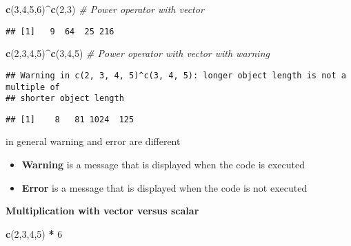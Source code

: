\documentclass[
]{article}
\newenvironment{Shaded}{\begin{snugshade}}{\end{snugshade}}
\newcommand{\CommentTok}[1]{\textcolor[rgb]{0.56,0.35,0.01}{\textit{#1}}}
\newcommand{\DecValTok}[1]{\textcolor[rgb]{0.00,0.00,0.81}{#1}}
\newcommand{\FunctionTok}[1]{\textcolor[rgb]{0.13,0.29,0.53}{\textbf{#1}}}
\newcommand{\NormalTok}[1]{#1}
\newcommand{\SpecialCharTok}[1]{\textcolor[rgb]{0.81,0.36,0.00}{\textbf{#1}}}
\begin{document}
\begin{Shaded}
\begin{Highlighting}[]
\FunctionTok{c}\NormalTok{(}\DecValTok{3}\NormalTok{,}\DecValTok{4}\NormalTok{,}\DecValTok{5}\NormalTok{,}\DecValTok{6}\NormalTok{)}\SpecialCharTok{\^{}}\FunctionTok{c}\NormalTok{(}\DecValTok{2}\NormalTok{,}\DecValTok{3}\NormalTok{) }\CommentTok{\# Power operator with vector}
\end{Highlighting}
\end{Shaded}

\begin{verbatim}
## [1]   9  64  25 216
\end{verbatim}

\begin{Shaded}
\begin{Highlighting}[]
\FunctionTok{c}\NormalTok{(}\DecValTok{2}\NormalTok{,}\DecValTok{3}\NormalTok{,}\DecValTok{4}\NormalTok{,}\DecValTok{5}\NormalTok{)}\SpecialCharTok{\^{}}\FunctionTok{c}\NormalTok{(}\DecValTok{3}\NormalTok{,}\DecValTok{4}\NormalTok{,}\DecValTok{5}\NormalTok{) }\CommentTok{\# Power operator with vector with warning}
\end{Highlighting}
\end{Shaded}

\begin{verbatim}
## Warning in c(2, 3, 4, 5)^c(3, 4, 5): longer object length is not a multiple of
## shorter object length
\end{verbatim}

\begin{verbatim}
## [1]    8   81 1024  125
\end{verbatim}

in general warning and error are different

\begin{itemize}
\item
  \textbf{Warning} is a message that is displayed when the code is
  executed
\item
  \textbf{Error} is a message that is displayed when the code is not
  executed
\end{itemize}

\textbf{Multiplication with vector versus scalar}

\begin{Shaded}
\begin{Highlighting}[]
\FunctionTok{c}\NormalTok{(}\DecValTok{2}\NormalTok{,}\DecValTok{3}\NormalTok{,}\DecValTok{4}\NormalTok{,}\DecValTok{5}\NormalTok{) }\SpecialCharTok{*} \DecValTok{6} 
\end{Highlighting}
\end{Shaded}
\end{document}
